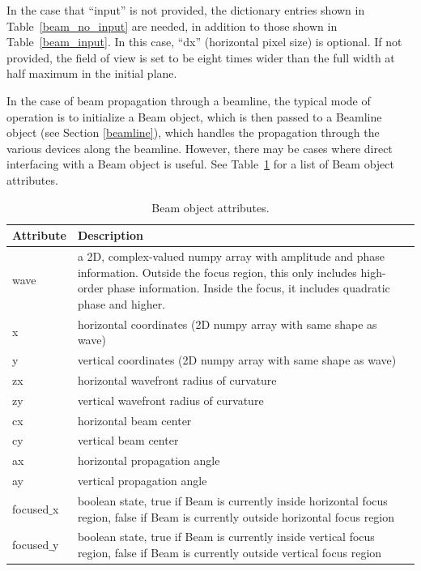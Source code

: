 \documentclass[11pt,fleqn]{article} %
\begin{document}
In the case that ``input'' is not provided, the dictionary entries shown in Table~\ref{beam_no_input} are needed, in addition to those shown in Table~\ref{beam_input}. In this case, ``dx'' (horizontal pixel size) is optional. If not provided, the field of view is set to be eight times wider than the full width at half maximum in the initial plane.

In the case of beam propagation through a beamline, the typical mode of operation is to initialize a Beam object, which is then passed to a Beamline object (see Section \ref{beamline}), which handles the propagation through the various devices along the beamline. However, there may be cases where direct interfacing with a Beam object is useful. See Table~\ref{beam_attributes} for a list of Beam object attributes.
\begin{table}
  \begin{center}
    \caption{Beam object attributes.}
    \label{beam_attributes}
    \begin{tabular}{ | p{2.5cm} || p{10cm} |}
      \hline
      \textbf{Attribute} & \textbf{Description}\\\hline
      wave & a 2D, complex-valued numpy array with amplitude and phase information. Outside the focus region, this only includes high-order phase information. Inside the focus, it includes quadratic phase and higher.\\\hline
      x & horizontal coordinates (2D numpy array with same shape as wave)\\\hline
      y & vertical coordinates (2D numpy array with same shape as wave)\\\hline
      zx & horizontal wavefront radius of curvature\\\hline
      zy & vertical wavefront radius of curvature\\\hline
      cx & horizontal beam center\\\hline
      cy & vertical beam center\\\hline
      ax & horizontal propagation angle\\\hline
      ay & vertical propagation angle\\\hline
      focused$\_$x & boolean state, true if Beam is currently inside horizontal focus region, false if Beam is currently outside horizontal focus region\\\hline
      focused$\_$y & boolean state, true if Beam is currently inside vertical focus region, false if Beam is currently outside vertical focus region\\\hline

\end{tabular}
\end{center}
\end{table}
\end{document}
